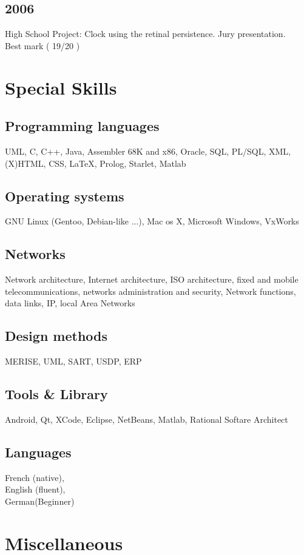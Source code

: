 	\subsection{2006}
		{High School Project: Clock using the retinal persistence. Jury presentation.\\ Best mark ( 19/20 )}
		
\section{Special Skills}
	\subsection{Programming languages}
		{UML, C, C++, Java, Assembler 68K and x86, Oracle, SQL, PL/SQL, XML, (X)HTML, CSS, \LaTeX, Prolog, Starlet, Matlab}
		
	\subsection{Operating systems}
		{GNU Linux (Gentoo, Debian-like ...), Mac os X, Microsoft Windows, VxWorks}
		
	\subsection{Networks}
		{Network architecture, Internet architecture, ISO architecture, fixed and mobile telecommunications, networks administration and security, Network functions, data links, IP, local Area Networks}

	\subsection{Design methods}
		{MERISE, UML, SART, USDP, ERP}
		
	\subsection{Tools \& Library}
		{Android, Qt, XCode, Eclipse, NetBeans, Matlab, Rational Softare Architect}
		
	\subsection{Languages}
		{French (native),\\English (fluent),\\German(Beginner)}
				
\section{Miscellaneous}
